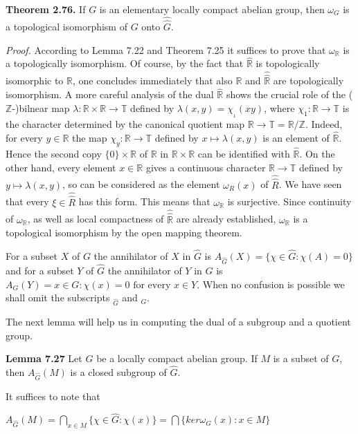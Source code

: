 \documentclass[12pt]{article}
\begin{document}
\begin{itemize}
\begin{itemize}
\textbf{Theorem 2.76.} If $G$ is an elementary locally compact abelian group, then $\omega_G$ is a topological isomorphism of
$G$ onto $\hat{\hat{G}}$.


\emph{Proof.} According to Lemma 7.22 and Theorem 7.25 it suffices to prove that $\omega_{\mathbb{R}}$ is a topologically isomorphism.
Of course, by the fact that $\hat{\mathbb{R}}$ is topologically isomorphic to $\mathbb{R}$, one concludes immediately that also $\mathbb{R}$ and $\hat{\hat{\mathbb{R}}}$
are topologically isomorphism. A more careful analysis of the dual $\hat{\mathbb{R}}$ shows the crucial role of the ($\mathbb{Z}$-)bilnear
map $\lambda : \mathbb{R} \times \mathbb{R} \to \mathbb{T}$ defined by $λ(x, y) = \chi__1(xy)$, where $\chi_1 : \mathbb{R} \to \mathbb{T}$ is the character determined by the canonical
quotient map $\mathbb{R} \to \mathbb{T} = \mathbb{R}/\mathbb{Z}$. Indeed, for every $y \in \mathbb{R}$ the map $\chi_y : \mathbb{R} \to \mathbb{T}$ defined by $x \mapsto \lambda(x, y)$ is an element
of $\hat{\mathbb{R}}$. Hence the second copy $\{0\} \times \mathbb{R}$ of $\mathbb{R}$ in $\mathbb{R} \times \mathbb{R}$ can be identified with $\hat{\mathbb{R}}$. On the other hand, every element
$x \in \mathbb{R}$ gives a continuous character $\mathbb{R} \to \mathbb{T}$ defined by $y \mapsto \lambda(x, y)$, so can be considered as the element $\omega_R(x)$ of
$\hat{\hat{R}}$. We have seen that every $\xi \in \hat{\hat{R}}$ has this form. This means that $\omega_{\mathbb{R}}$ is surjective. Since continuity of $\omega_{\mathbb{R}}$, as
well as local compactness of $\hat{\hat{\mathbb{R}}}$ are already established, $\omega_{\mathbb{R}}$ is a topological isomorphism by the open mapping
theorem.


    For a subset $X$ of $G$ the annihilator of $X$ in $\hat{G}$ is $A_{\hat{G}}(X) = \{\chi \in \hat{G} : \chi(A) = {0}\}$ and for a subset $Y$ of $\hat{G}$
the annihilator of $Y$ in $G$ is $A_G(Y ) = {x \in G : \chi(x) = 0 \text{ for every } x \in Y }$. When no confusion is possible we
shall omit the subscripts $_{\hat{G}}$ and $_G$.


    The next lemma will help us in computing the dual of a subgroup and a quotient group.


\textbf{Lemma 7.27} Let $G$ be a locally compact abelian group. If $M$ is a subset of $G$, then $A_{\hat{G}} (M)$ is a closed subgroup
of $\hat{G}$.


     It suffices to note that


        $A_{\hat{G}}(M) = \bigcap_{x \in M} \{ \chi \in \hat{G} : \chi(x) \} = \bigcap\{ker \omega_G(x) : x \in M \}$



\end{itemize}
\end{itemize}
\end{document}
